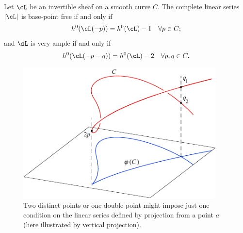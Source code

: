\begin{proposition}\label{very ample}
{\rm\cite[Theorem IV.3.1]{Hartshorne1977}}
Let $\cL$ be an invertible sheaf on a smooth curve $C$. The complete linear series $|\cL|$ is base-point free if and only if
$$
h^0(\cL(-p)) = h^0(\cL) - 1 \quad \forall p \in C;
$$
and $\sL$ is very ample if and only if
$$
h^0(\cL(-p-q)) = h^0(\cL) - 2 \quad \forall p, q \in C.
\vspace*{-\parskip}
$$
\end{proposition} 

\begin{figure}
\centerline {\includegraphics[height=2.8in]{"main/Fig01-3"}}
 \caption{Two distinct points or one double point might impose just
   one condition on the linear series defined by projection from a
   point $a$ (here illustrated by vertical projection).
}
\end{figure}

